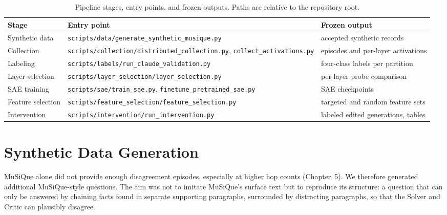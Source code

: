 \begin{table}[htbp]
    \centering
    \caption{Pipeline stages, entry points, and frozen outputs. Paths are
    relative to the repository root.}
    \label{tab:pipeline-stages}
    \small
    \begin{tabular}{p{}p{}p{}}
        \toprule
        Stage & Entry point & Frozen output \\
        \midrule
        Synthetic data & \texttt{scripts/data/generate\_synthetic\_musique.py} & accepted synthetic records \\
        Collection & \texttt{scripts/collection/distributed\_collection.py}, \texttt{collect\_activations.py} & episodes and per-layer activations \\
        Labeling & \texttt{scripts/labels/run\_claude\_validation.py} & four-class labels per partition \\
        Layer selection & \texttt{scripts/layer\_selection/layer\_selection.py} & per-layer probe comparison \\
        SAE training & \texttt{scripts/sae/train\_sae.py}, \texttt{finetune\_pretrained\_sae.py} & SAE checkpoints \\
        Feature selection & \texttt{scripts/feature\_selection/feature\_selection.py} & targeted and random feature sets \\
        Intervention & \texttt{scripts/intervention/run\_intervention.py} & labeled edited generations, tables \\
        \bottomrule
    \end{tabular}
\end{table}

\section{Synthetic Data Generation}
\label{sec:synthetic-generation}

MuSiQue alone did not provide enough disagreement episodes, especially at
higher hop counts (Chapter~5). We therefore generated additional
MuSiQue-style questions. The aim was not to imitate MuSiQue's surface text but
to reproduce its structure: a question that can only be answered by chaining
facts found in separate supporting paragraphs, surrounded by distracting
paragraphs, so that the Solver and Critic can plausibly disagree.

